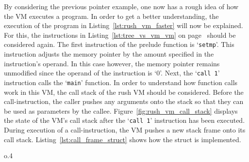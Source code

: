 By considering the previous pointer example, one now has a rough idea of how the VM executes a program.
In order to get a better understanding, the execution of the program in Listing~\ref{lst:rush_vm_faster} will now be explained.
For this, the instructions in Listing~\ref{lst:tree_vs_vm_vm} on page~\pageref{lst:tree_vs_vm_vm} should be considered again.
The first instruction of the prelude function is `\texttt{setmp}'.
This instruction adjusts the memory pointer by the amount specified in the instruction's operand.
In this case however, the memory pointer remains unmodified since the operand of the instruction is `0'.
Next, the `\texttt{call 1}' instruction calls the `\texttt{main}' function.
In order to understand how function calls work in this VM, the call stack of the rush VM should be considered.
Before the call-instruction, the caller pushes any arguments onto the stack so that they can be used as parameters by the callee.
Figure~\ref{fig:rush_vm_call_stack} displays the state of the VM's call stack after the `\texttt{call 1}' instruction has been executed.
During execution of a call-instruction, the VM pushes a new stack frame onto its call stack.
Listing~\ref{lst:call_frame_struct} shows how the  struct is implemented.


\begin{wrapfigure}{o}{.4\textwidth}
	\centering
	\caption{Example call stack of the rush VM.}\label{fig:rush_vm_call_stack}
\end{wrapfigure}


